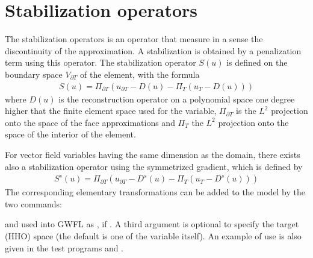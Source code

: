 \documentclass[a4paper,11pt,english]{sphinxmanual}
\begin{document}
\section{Stabilization operators}
\label{\detokenize{userdoc/hho:stabilization-operators}}
The stabilization operators is an operator that measure in a sense the discontinuity of the approximation. A stabilization is obtained by a penalization term using this operator. The stabilization operator \(S(u)\) is defined on the boundary space \(V_{\partial T}\) of the element, with the formula
\begin{equation*}
\begin{split}S(u) = \Pi_{\partial T}(u_{\partial T} - D(u) - \Pi_{T}(u_T - D(u)))\end{split}
\end{equation*}
where \(D(u)\) is the reconstruction operator on a polynomial space one degree higher that the finite element space used for the variable, \(\Pi_{\partial T}\) is the \(L^2\) projection onto the space of the face approximations and  \(\Pi_{T}\) the \(L^2\) projection onto the space of the interior of the element.

For vector field variables having the same dimension as the domain, there exists also a stabilization operator using the symmetrized gradient, which is defined by
\begin{equation*}
\begin{split}S^s(u) = \Pi_{\partial T}(u_{\partial T} - D^s(u) - \Pi_{T}(u_T - D^s(u)))\end{split}
\end{equation*}
The corresponding elementary transformations can be added to the model by the two commands:

\begin{sphinxVerbatim}[commandchars=\\\{\}]
 
 
\end{sphinxVerbatim}

and used into GWFL as , if . A third argument is optional to specify the target (HHO) space (the default is one of the variable itself). An example of use is also given in the test programs  and .
\end{document}
